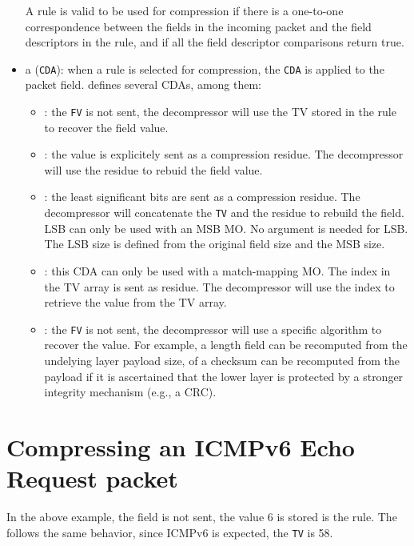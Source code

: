 \begin{itemize}
    A rule is valid to be used for compression if there is a one-to-one correspondence between the fields in the incoming packet and the field descriptors in the rule, and if all the field descriptor comparisons return true. 


    \item a  (\texttt{CDA}): when a rule is selected for compression, the \texttt{CDA} is applied to the packet field.  defines several CDAs, among them:

    \begin{itemize}
        \item {}: the \texttt{FV} is not sent, the decompressor will use the TV stored in the rule to recover the field value.
        \item {}: the value is explicitely sent as a compression residue. The decompressor will use the residue to rebuid the field value.
        \item {}: the least significant bits are sent as a compression residue. The decompressor will concatenate the \texttt{TV} and the residue to rebuild the field. LSB can only be used with an MSB MO. No argument is needed for LSB. The LSB size is defined from the original field size and the MSB size.
        \item {}:  this CDA can only be used with a match-mapping MO. The index in the TV array is sent as residue. The decompressor will use the index to retrieve the value from the TV array.
        \item {}: the \texttt{FV} is not sent, the decompressor will use a specific algorithm to recover the value. For example, a length field can be recomputed from the undelying layer payload size, of a checksum can be recomputed from the payload if it is ascertained that the lower layer is protected by a stronger integrity mechanism (e.g., a CRC).
    \end{itemize}

\end{itemize}

\section{Compressing an ICMPv6 Echo Request packet}

In the above example, the  field is not sent, the value 6 is stored is the rule. 
The  follows the same behavior, since ICMPv6 is expected, the \texttt{TV} is 58.

